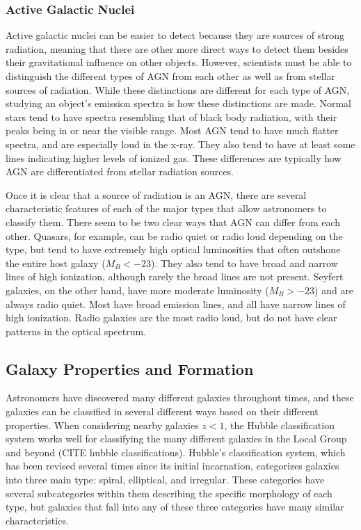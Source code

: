 \documentclass[12pt]{article}
\begin{document}
    \subsubsection{Active Galactic Nuclei}
    Active galactic nuclei can be easier to detect because they are sources of
    strong radiation, meaning that there are other more direct ways to detect
    them besides their gravitational influence on other objects.  However,
    scientists must be able to distinguish the different types of AGN from each
    other as well as from stellar sources of radiation.  While these
    distinctions are different for each type of AGN, studying an object's
    emission spectra is how these distinctions are made.  Normal stars tend to
    have spectra resembling that of black body radiation, with their peaks being
    in or near the visible range.  Most AGN tend to have much flatter spectra,
    and are especially loud in the x-ray.  They also tend to have at least some
    lines indicating higher levels of ionized gas.  These differences are
    typically how AGN are differentiated from stellar radiation sources.

    Once it is clear that a source of radiation is an AGN, there are several
    characteristic features of each of the major types that allow astronomers to
    classify them.  There seem to be two clear ways that AGN can differ from
    each other.  Quasars, for example, can be radio quiet or radio loud
    depending on the type, but tend to have extremely high optical luminosities
    that often outshone the entire host galaxy ($M_B < -23$).  They also tend to
    have broad and narrow lines of high ionization, although rarely the broad
    lines are not present.  Seyfert galaxies, on the other hand, have more
    moderate luminosity ($M_B > -23$) and are always radio quiet.  Most have
    broad emission lines, and all have narrow lines of high ionization.  Radio
    galaxies are the most radio loud, but do not have clear patterns in the
    optical spectrum.

\subsection{Galaxy Properties and Formation}
Astronomers have discovered many different galaxies throughout times, and these
galaxies can be classified in several different ways based on their different
properties.  When considering nearby galaxies $z < 1$, the Hubble
classification system works well for classifying the many different galaxies in
the Local Group and beyond (CITE hubble classifications).  Hubble's
classification system, which has been revised several times since its initial
incarnation, categorizes galaxies into three main type: spiral, elliptical, and
irregular.  These categories have several subcategories within them describing
the specific morphology of each type, but galaxies that fall into any of these
three categories have many similar characteristics.
\end{document}
